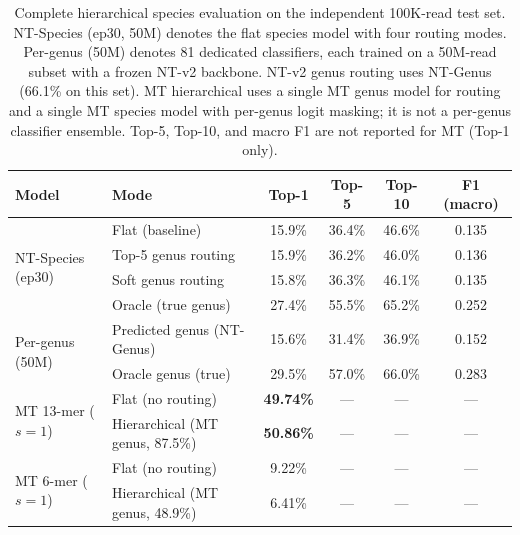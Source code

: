 \begin{table}[htbp]
    \centering
    \caption{Complete hierarchical species evaluation on the independent 100K-read test set.
    NT-Species (ep30, 50M) denotes the flat species model with four routing modes.
    Per-genus (50M) denotes 81 dedicated classifiers, each trained on a 50M-read subset with a frozen NT-v2 backbone.
    NT-v2 genus routing uses NT-Genus (66.1\% on this set).
    MT hierarchical uses a single MT genus model for routing and a single MT species model with per-genus logit masking; it is not a per-genus classifier ensemble.
    Top-5, Top-10, and macro F1 are not reported for MT (Top-1 only).}
    \label{tab:hierarchical-prelim}
    \small
    \setlength{\tabcolsep}{4pt}
    \begin{tabular}{llcccc}
        \toprule
        \textbf{Model} & \textbf{Mode} & \textbf{Top-1} & \textbf{Top-5} & \textbf{Top-10} & \textbf{F1 (macro)} \\
        \midrule
        \multirow{4}{*}{NT-Species (ep30)} & Flat (baseline)     & 15.9\% & 36.4\% & 46.6\% & 0.135 \\
                                        & Top-5 genus routing & 15.9\% & 36.2\% & 46.0\% & 0.136 \\
                                        & Soft genus routing  & 15.8\% & 36.3\% & 46.1\% & 0.135 \\
                                        & Oracle (true genus) & 27.4\% & 55.5\% & 65.2\% & 0.252 \\
        \midrule
        \multirow{2}{*}{Per-genus (50M)} & Predicted genus (NT-Genus) & 15.6\% & 31.4\% & 36.9\% & 0.152 \\
                                          & Oracle genus (true)  & 29.5\% & 57.0\% & 66.0\% & 0.283 \\
        \midrule
        \multirow{2}{*}{MT 13-mer ($s{=}1$)} & Flat (no routing)              & \textbf{49.74\%} & --- & --- & --- \\
                                              & Hierarchical (MT genus, 87.5\%) & \textbf{50.86\%} & --- & --- & --- \\
        \midrule
        \multirow{2}{*}{MT 6-mer ($s{=}1$)}  & Flat (no routing)              & 9.22\%  & --- & --- & --- \\
                                              & Hierarchical (MT genus, 48.9\%) & 6.41\%  & --- & --- & --- \\
        \bottomrule
    \end{tabular}
\end{table}

